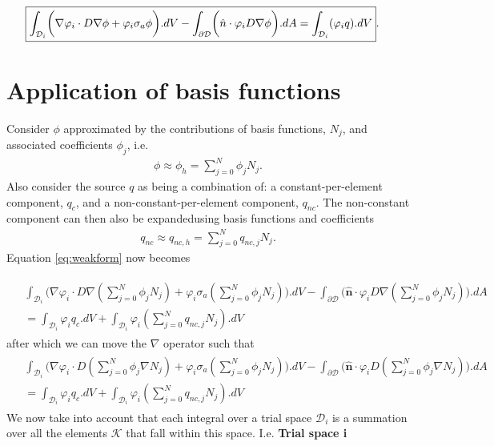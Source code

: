 \documentclass[11pt,letterpaper,titlepage]{article}
\newcommand{\bOmega}{\mathcal{D}}
\numberwithin{equation}{section}
\begin{document}
\begin{align}\label{eq:weakform}
\Aboxed{
\int_{\bOmega_i} \biggr(
\nabla \varphi_i\cdot D\nabla \phi
+
\varphi_i\sigma_a  \phi 
\biggr).dV 
- 
\int_{\partial \bOmega}\biggr( 
\hat{n}\cdot \varphi_i D\nabla \phi 
\biggr). dA
= \int_{\bOmega_i} (\varphi_i q).dV
}.
\end{align}

\newpage
{}
\section{Application of basis functions}
Consider $\phi$ approximated by the contributions of basis functions, $N_j$, and associated coefficients $\phi_j$, i.e.
\begin{align}
\phi \approx \phi_h = \sum_{j=0}^N \phi_j N_j.
\end{align}
Also consider the source $q$ as being a combination of: a constant-per-element component, $q_c$, and a non-constant-per-element component, $q_{nc}$. The non-constant component can then also be expandedusing basis functions and coefficients
\begin{align}
q_{nc} \approx q_{nc,h} = \sum_{j=0}^N q_{nc,j} N_j.
\end{align}
\newline
Equation \ref{eq:weakform} now becomes 

\begin{align*}
\begin{aligned}
&\int_{\bOmega_i} \biggr(
\nabla \varphi_i\cdot D\nabla (\sum_{j=0}^N \phi_j N_j)
+
\varphi_i\sigma_a  (\sum_{j=0}^N \phi_j N_j)
\biggr).dV
-
\int_{\partial \bOmega}\biggr( 
\mathbf{\hat{n}}\cdot \varphi_i D\nabla (\sum_{j=0}^N \phi_j N_j) 
\biggr). dA
\\
&= \int_{\bOmega_i} \varphi_i q_c.dV + \int_{\bOmega_i} \varphi_i (\sum_{j=0}^N q_{nc,j} N_j).dV 
\end{aligned}
\end{align*}
\noindent after which we can move the $\nabla$ operator such that
\begin{align*}
\begin{aligned}
&\int_{\bOmega_i} \biggr(
\nabla \varphi_i\cdot D (\sum_{j=0}^N \phi_j \nabla N_j)
+ 
\varphi_i\sigma_a  (\sum_{j=0}^N \phi_j N_j)
\biggr).dV
-
\int_{\partial \bOmega}\biggr( 
\mathbf{\hat{n}}\cdot \varphi_i D (\sum_{j=0}^N \phi_j \nabla N_j) 
\biggr). dA 
\\
&= \int_{\bOmega_i} \varphi_i q_c.dV+
 \int_{\bOmega_i} \varphi_i (\sum_{j=0}^N q_{nc,j} N_j).dV 
\end{aligned}
\end{align*}
\newline
We now take into account that each integral over a trial space $\bOmega_i$ is a summation over all the elements $\mathcal{K}$ that fall within this space. I.e.
\newline
\newline
\textbf{Trial space i}
\end{document}
